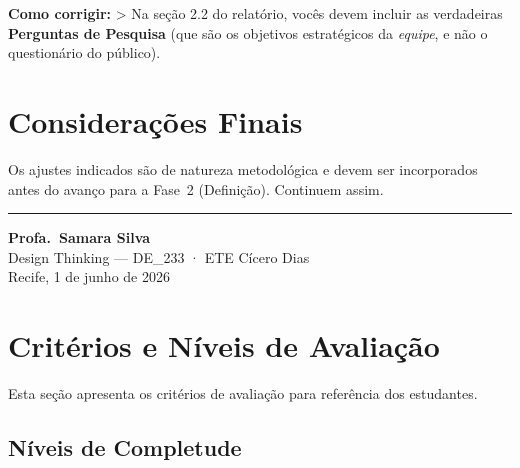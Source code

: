 \documentclass[
  sigconf,
  nonacm, %
  language=portuguese
]{acmart}
\begin{document}
\textbf{Como corrigir:} > Na seção 2.2 do relatório, vocês devem incluir as verdadeiras \textbf{Perguntas de Pesquisa} (que são os objetivos estratégicos da \textit{equipe}, e não o questionário do público).

\section{Considerações Finais}

Os ajustes indicados são de natureza metodológica e devem ser
incorporados antes do avanço para a Fase~2 (Definição).
Continuem assim.


\vspace{1.5em}
\noindent\rule{\linewidth}{0.4pt}

\begin{flushright}
\textbf{Profa.\ Samara Silva}\\
{\small\color{cmuted} Design Thinking --- DE\_233 · ETE Cícero Dias}\\
{\small\color{cmuted} Recife, 1 de junho de 2026}
\end{flushright}


\appendix
\onecolumn
\section{Critérios e Níveis de Avaliação}

Esta seção apresenta os critérios de avaliação para referência dos estudantes.

\subsection{Níveis de Completude}
\end{document}

